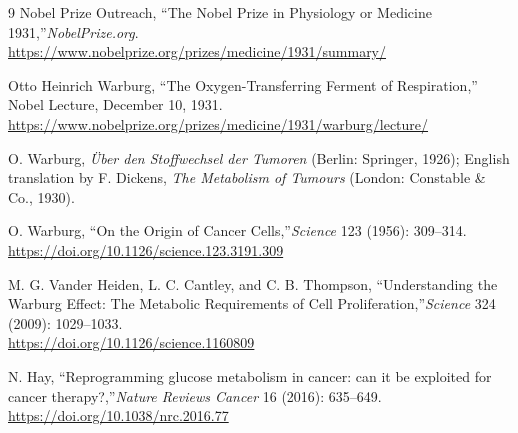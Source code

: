 \begin{thebibliography}{9}
Nobel Prize Outreach, ``The Nobel Prize in Physiology or Medicine 1931,''\emph{NobelPrize.org}.\\
\url{https://www.nobelprize.org/prizes/medicine/1931/summary/}

Otto Heinrich Warburg, ``The Oxygen-Transferring Ferment of Respiration,'' Nobel Lecture, December 10, 1931.\\
\url{https://www.nobelprize.org/prizes/medicine/1931/warburg/lecture/}

O. Warburg, \emph{Über den Stoffwechsel der Tumoren} (Berlin: Springer, 1926); English translation by F. Dickens, \emph{The Metabolism of Tumours} (London: Constable \& Co., 1930).

O. Warburg, ``On the Origin of Cancer Cells,''\emph{Science} 123 (1956): 309--314.\\
\url{https://doi.org/10.1126/science.123.3191.309}

M. G. Vander Heiden, L. C. Cantley, and C. B. Thompson, ``Understanding the Warburg Effect: The Metabolic Requirements of Cell Proliferation,''\emph{Science} 324 (2009): 1029--1033.\\
\url{https://doi.org/10.1126/science.1160809}

N. Hay, ``Reprogramming glucose metabolism in cancer: can it be exploited for cancer therapy?,''\emph{Nature Reviews Cancer} 16 (2016): 635--649.\\
\url{https://doi.org/10.1038/nrc.2016.77}
\end{thebibliography}
